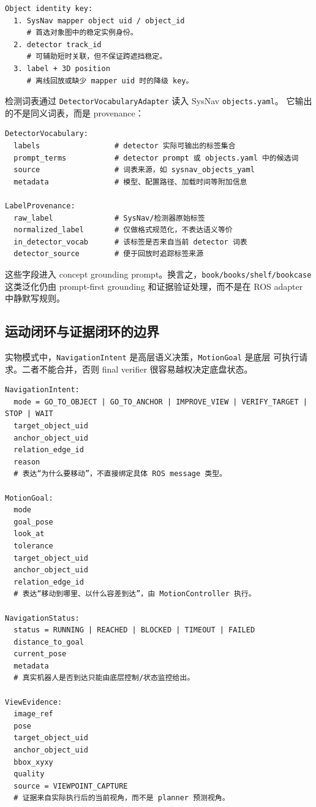 \documentclass[UTF8,zihao=-4]{ctexart}
\begin{document}
\begin{lstlisting}[style=pseudo,caption={Object identity priority}]
Object identity key:
  1. SysNav mapper object uid / object_id
     # 首选对象图中的稳定实例身份。
  2. detector track_id
     # 可辅助短时关联，但不保证跨遮挡稳定。
  3. label + 3D position
     # 离线回放或缺少 mapper uid 时的降级 key。
\end{lstlisting}

检测词表通过 \texttt{DetectorVocabularyAdapter} 读入 SysNav \texttt{objects.yaml}。
它输出的不是同义词表，而是 provenance：

\begin{lstlisting}[style=pseudo,caption={Detector vocabulary provenance}]
DetectorVocabulary:
  labels                 # detector 实际可输出的标签集合
  prompt_terms           # detector prompt 或 objects.yaml 中的候选词
  source                 # 词表来源，如 sysnav_objects_yaml
  metadata               # 模型、配置路径、加载时间等附加信息

LabelProvenance:
  raw_label              # SysNav/检测器原始标签
  normalized_label       # 仅做格式规范化，不表达语义等价
  in_detector_vocab      # 该标签是否来自当前 detector 词表
  detector_source        # 便于回放时追踪标签来源
\end{lstlisting}

这些字段进入 concept grounding prompt。换言之，\texttt{book/books/shelf/bookcase}
这类泛化仍由 prompt-first grounding 和证据验证处理，而不是在 ROS adapter 中静默写规则。

\subsection{运动闭环与证据闭环的边界}

实物模式中，\texttt{NavigationIntent} 是高层语义决策，\texttt{MotionGoal} 是底层
可执行请求。二者不能合并，否则 final verifier 很容易越权决定底盘状态。

\begin{lstlisting}[style=pseudo,caption={Motion and evidence boundary}]
NavigationIntent:
  mode = GO_TO_OBJECT | GO_TO_ANCHOR | IMPROVE_VIEW | VERIFY_TARGET | STOP | WAIT
  target_object_uid
  anchor_object_uid
  relation_edge_id
  reason
  # 表达“为什么要移动”，不直接绑定具体 ROS message 类型。

MotionGoal:
  mode
  goal_pose
  look_at
  tolerance
  target_object_uid
  anchor_object_uid
  relation_edge_id
  # 表达“移动到哪里、以什么容差到达”，由 MotionController 执行。

NavigationStatus:
  status = RUNNING | REACHED | BLOCKED | TIMEOUT | FAILED
  distance_to_goal
  current_pose
  metadata
  # 真实机器人是否到达只能由底层控制/状态监控给出。

ViewEvidence:
  image_ref
  pose
  target_object_uid
  anchor_object_uid
  bbox_xyxy
  quality
  source = VIEWPOINT_CAPTURE
  # 证据来自实际执行后的当前视角，而不是 planner 预测视角。
\end{lstlisting}
\end{document}
